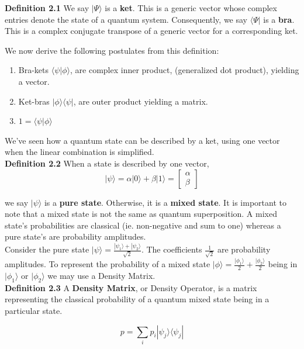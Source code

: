 \documentclass[letterpaper, 10 pt, conference]{ieeeconf}
\begin{document}
\textbf{Definition 2.1} We say \( |\Psi\rangle \) is a \textbf{ket}.  This is a generic vector whose complex entries denote the state of a quantum system.  Consequently, we say \( \langle\Psi| \) is a \textbf{bra}.  This is a complex conjugate transpose of a generic vector for a corresponding ket.

We now derive the following postulates from this definition:

\begin{enumerate}[I]
  \item Bra-kets \( \langle\psi|\phi\rangle \), are complex inner product, (generalized dot product), yielding a vector.
  \item Ket-bras \( |\phi\rangle\langle\psi| \), are outer product yielding a matrix.
  \item \( 1 = \langle\psi|\phi\rangle \)
\end{enumerate}

We've seen how a quantum state can be described by a ket, using one vector when the linear combination is simplified. \\

\textbf{Definition 2.2} When a state is described by one vector,
\[
|\psi\rangle = \alpha|0\rangle + \beta|1\rangle = 
\begin{bmatrix} \alpha \\ \beta \end{bmatrix}
\]

we say \( |\psi\rangle \) is a \textbf{pure state}.  Otherwise, it is a \textbf{mixed state}.  It is important to note that a mixed state is not the same as quantum superposition.  A mixed state's probabilities are classical (ie. non-negative and sum to one) whereas a pure state's are probability amplitudes. \\

Consider the pure state \( |\psi\rangle = \frac{|\psi_1\rangle + |\psi_2\rangle}{\sqrt{2}} \).  The coefficients \( \frac{1}{\sqrt{2}} \) are probability amplitudes.  To represent the probability of a mixed state \( |\phi\rangle = \frac{|\phi_1\rangle}{2} + \frac{|\phi_2\rangle}{2} \) being in \( |\phi_1\rangle \) or \( |\phi_2\rangle \) we may use a Density Matrix. \\

\textbf{Definition 2.3} A \textbf{Density Matrix}, or Density Operator, is a matrix representing the classical probability of a quantum mixed state being in a particular state.

\begin{equation}
p = \sum_{i} p_{i} |\psi_j\rangle \langle\psi_j|
\end{equation}
\end{document}
